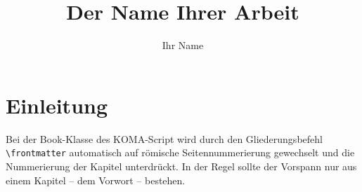 \documentclass[a4paper,
	twoside,
	openany,							%
	headsepline,					%
	footsepline,					%
	headings = normal,
	toc  	 = chapterentrywithdots,
	listof = totoc,
	listof = entryprefix,
	bibliography = totoc	%
]
{scrbook}
\begin{document}



\title{Der Name Ihrer Arbeit}
\author{Ihr Name}\pagestyle{scrheadings}



\maketitle 						%

\tableofcontents			%


\frontmatter					%
\pagestyle{scrheadings}
\chapter{Einleitung}

Bei der Book-Klasse des KOMA-Script wird durch den Gliederungsbefehl \verb#\frontmatter# automatisch auf römische Seitennummerierung gewechselt und die Nummerierung der Kapitel unterdrückt. In der Regel sollte der Vorspann nur aus einem Kapitel -- dem Vorwort -- bestehen.
\end{document}
